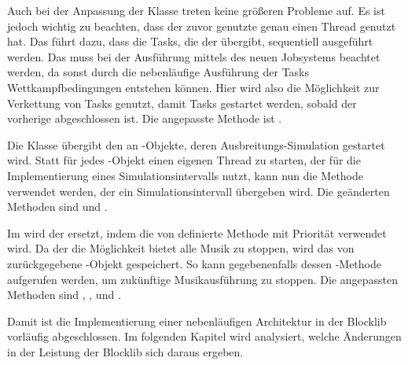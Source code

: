 Auch bei der Anpassung der Klasse \classEventManager{} treten keine größeren Probleme auf. Es ist jedoch wichtig zu beachten, dass der zuvor genutzte \classExecutorService{} genau einen Thread genutzt hat. Das führt dazu, dass die Tasks, die der \classEventManager{} übergibt, sequentiell ausgeführt werden. Das muss bei der Ausführung mittels des neuen Jobsystems beachtet werden, da sonst durch die nebenläufige Ausführung der Tasks Wettkampfbedingungen entstehen können. Hier wird also die Möglichkeit zur Verkettung von Tasks genutzt, damit Tasks gestartet werden, sobald der vorherige abgeschlossen ist. Die angepasste Methode ist .

Die Klasse \classFluidManager{} übergibt den \classBlocklibExecutor{} an \classFluid{}-Objekte, deren Aus\-brei\-tungs-Si\-mu\-la\-ti\-on gestartet wird. Statt für jedes \classFluid{}-Objekt einen eigenen Thread zu starten, der  für die Implementierung eines Simulationsintervalls nutzt, kann nun die Methode  verwendet werden, der ein Simulationsintervall übergeben wird. Die geänderten Methoden sind  und .

Im \classAudioManager{} wird der \classTimer{} ersetzt, indem die von \classBlocklibExecutorService{} definierte Methode  mit Priorität  verwendet wird. Da der \classAudioManager{} die Möglichkeit bietet alle Musik zu stoppen, wird das von  zurückgegebene \classFuture{}-Objekt gespeichert. So kann gegebenenfalls dessen -Methode aufgerufen werden, um zukünftige Musikausführung zu stoppen. Die angepassten Methoden sind , ,  und .

Damit ist die Implementierung einer nebenläufigen Architektur in der Blocklib vorläufig abgeschlossen. Im folgenden Kapitel wird analysiert, welche Änderungen in der Leistung der Blocklib sich daraus ergeben.